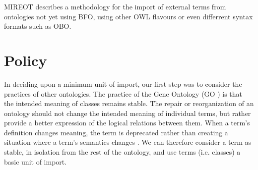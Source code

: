 \documentclass{elsart3p}    %
\begin{document}

MIREOT describes a methodology for the import of external terms from ontologies not yet using BFO, using other OWL flavours or even differrent syntax formats such as OBO.

\section*{Policy}

In deciding upon a minimum unit of import, our first step was to consider the practices of other ontologies.
The practice of the Gene Ontology (GO \cite{RefWorks:79}) is that the intended meaning of classes remains stable.
The repair or reorganization of an ontology should not change the intended meaning of individual terms, but rather provide a better expression of the logical relations between them.
When a term's definition changes meaning, the term is deprecated rather than creating a situation where a term's semantics changes \cite{RefWorks:1560}.
We can therefore consider a term as stable, in isolation from the rest of the ontology, and use terms (i.e. classes) a basic unit of import. 


\end{document}
